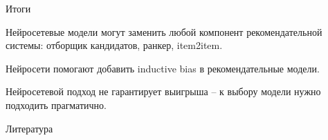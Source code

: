 \documentclass[11pt,aspectratio=169]{beamer}
\begin{document}
\begin{frame}{Итоги}

\begin{tcolorbox}[colback=info!5,colframe=info!80,title=]
Нейросетевые модели могут заменить любой компонент рекомендательной системы: отборщик кандидатов, ранкер, item2item.
\end{tcolorbox}

\begin{tcolorbox}[colback=info!5,colframe=info!80,title=]
Нейросети помогают добавить inductive bias в рекомендательные модели.
\end{tcolorbox}

\begin{tcolorbox}[colback=warn!5,colframe=warn!80,title=]
Нейросетевой подход не гарантирует выигрыша -- к выбору модели нужно подходить прагматично.
\end{tcolorbox}

\end{frame}

\begin{frame}[allowframebreaks]{Литература}




\end{frame}
\end{document}
